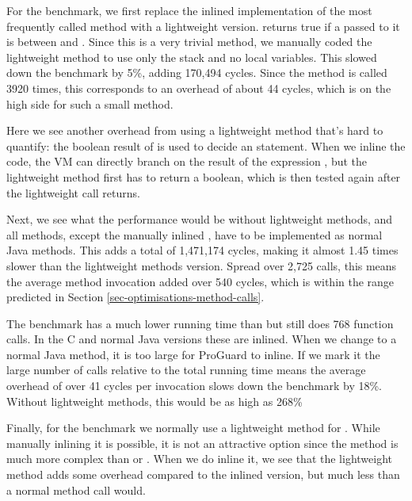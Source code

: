 For the benchmark, we first replace the inlined implementation of the most frequently called method with a lightweight version.  returns true if a  passed to it is between  and . Since this is a very trivial method, we manually coded the lightweight method to use only the stack and no local variables. This slowed down the benchmark by 5\%, adding 170,494 cycles. Since the method is called 3920 times, this corresponds to an overhead of about 44 cycles, which is on the high side for such a small method.

Here we see another overhead from using a lightweight method that's hard to quantify: the boolean result of  is used to decide an  statement. When we inline the code, the VM can directly branch on the result of the expression , but the lightweight method first has to return a boolean, which is then tested again after the lightweight call returns.

Next, we see what the performance would be without lightweight methods, and all methods, except the manually inlined , have to be implemented as normal Java methods. This adds a total of 1,471,174 cycles, making it almost 1.45 times slower than the lightweight methods version. Spread over 2,725 calls, this means the average method invocation added over 540 cycles, which is within the range predicted in Section \ref{sec-optimisations-method-calls}.

The  benchmark has a much lower running time than  but still does 768 function calls. In the C and normal Java versions these are inlined. When we change  to a normal Java method, it is too large for ProGuard to inline. If we mark it  the large number of calls relative to the total running time means the average overhead of over 41 cycles per invocation slows down the benchmark by 18\%. Without lightweight methods, this would be as high as 268\%

Finally, for the  benchmark we normally use a lightweight method for . While manually inlining it is possible, it is not an attractive option since the  method is much more complex than  or . When we do inline it, we see that the lightweight method adds some overhead compared to the inlined version, but much less than a normal method call would.


